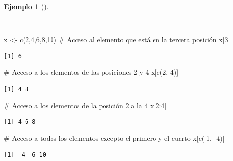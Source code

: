 \documentclass[
  a4paper,
]{scrreport}
\newenvironment{Shaded}{\begin{snugshade}}{\end{snugshade}}
\newcommand{\CommentTok}[1]{\textcolor[rgb]{0.37,0.37,0.37}{#1}}
\newcommand{\DecValTok}[1]{\textcolor[rgb]{0.68,0.00,0.00}{#1}}
\newcommand{\FunctionTok}[1]{\textcolor[rgb]{0.28,0.35,0.67}{#1}}
\newcommand{\NormalTok}[1]{\textcolor[rgb]{0.00,0.23,0.31}{#1}}
\newcommand{\OtherTok}[1]{\textcolor[rgb]{0.00,0.23,0.31}{#1}}
\newcommand{\SpecialCharTok}[1]{\textcolor[rgb]{0.37,0.37,0.37}{#1}}
\theoremstyle{definition}
\theoremstyle{definition}
\newtheorem{example}{Ejemplo}[chapter]
\theoremstyle{remark}
\begin{document}
\begin{example}[]\protect\hypertarget{exm-acceso-vector}{}\label{exm-acceso-vector}

~

\begin{Shaded}
\begin{Highlighting}[]
\NormalTok{x }\OtherTok{\textless{}{-}} \FunctionTok{c}\NormalTok{(}\DecValTok{2}\NormalTok{,}\DecValTok{4}\NormalTok{,}\DecValTok{6}\NormalTok{,}\DecValTok{8}\NormalTok{,}\DecValTok{10}\NormalTok{)}
\CommentTok{\# Acceso al elemento que está en la tercera posición}
\NormalTok{x[}\DecValTok{3}\NormalTok{]}
\end{Highlighting}
\end{Shaded}

\begin{verbatim}
[1] 6
\end{verbatim}

\begin{Shaded}
\begin{Highlighting}[]
\CommentTok{\# Acceso a los elementos de las posiciones 2 y 4}
\NormalTok{x[}\FunctionTok{c}\NormalTok{(}\DecValTok{2}\NormalTok{, }\DecValTok{4}\NormalTok{)]}
\end{Highlighting}
\end{Shaded}

\begin{verbatim}
[1] 4 8
\end{verbatim}

\begin{Shaded}
\begin{Highlighting}[]
\CommentTok{\# Acceso a los elementos de la posición 2 a la 4}
\NormalTok{x[}\DecValTok{2}\SpecialCharTok{:}\DecValTok{4}\NormalTok{]}
\end{Highlighting}
\end{Shaded}

\begin{verbatim}
[1] 4 6 8
\end{verbatim}

\begin{Shaded}
\begin{Highlighting}[]
\CommentTok{\# Acceso a todos los elementos excepto el primero y el cuarto}
\NormalTok{x[}\FunctionTok{c}\NormalTok{(}\SpecialCharTok{{-}}\DecValTok{1}\NormalTok{, }\SpecialCharTok{{-}}\DecValTok{4}\NormalTok{)]}
\end{Highlighting}
\end{Shaded}

\begin{verbatim}
[1]  4  6 10
\end{verbatim}

\end{example}
\end{document}
